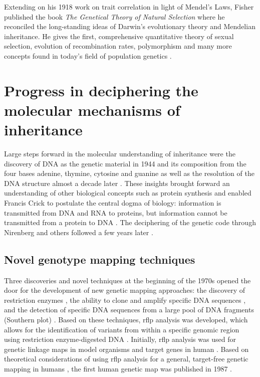 Extending on his 1918 work on trait correlation in light of Mendel's Laws, Fisher published the book \textit{The Genetical Theory of Natural Selection} where he reconciled the long-standing ideas of Darwin's evolutionary theory and Mendelian inheritance. He gives the first, comprehensive quantitative theory of sexual selection, evolution of recombination rates, polymorphism and many more concepts found in today's field of population genetics \citep{Fisher1930}. 

\section{Progress in deciphering the molecular mechanisms of inheritance}
Large steps forward in the molecular understanding of inheritance were the discovery of DNA as the genetic material in 1944 \citep{Avery1944} and its composition from the four bases adenine, thymine, cytosine and guanine \citep{Vischer1948,Chargaff1949,Chargaff1952} as well as the resolution of the DNA structure almost a decade later \citep{Watson1953}. These insights brought forward an understanding of other biological concepts such as protein synthesis and enabled Francis Crick to postulate the central dogma of biology:  information is transmitted from DNA and RNA to proteins, but information cannot be transmitted from a protein to DNA \citep{Crick1958}. The deciphering of the genetic code through Nirenberg and others followed a few years later \citep{Nirenberg1961,Crick1961,Matthaei1962}.  

\subsection{Novel genotype mapping techniques}
\label{subsection:mapping-techniques}
Three discoveries and novel techniques at the beginning of the 1970s opened the door for the development of new genetic mapping approaches: the discovery of restriction enzymes \citep{Smith1970,Morrow1972}, the ability to clone and amplify specific DNA sequences \citep{Jackson1972,Cohen1973}, and the detection of specific DNA sequences from a large pool of DNA fragments (Southern plot) \citep{Southern1975}. Based on these techniques, \gls{rflp} analysis was developed, which allows for the identification of variants from within a specific genomic region using restriction enzyme-digested DNA \citep{Grodzicker1974,Botstein1980}. Initially, \gls{rflp} analysis was used for genetic linkage maps in model organisms \citep{Goodman1977,Cameron1979} and target genes in human  \citep{Kan1978,Jeffreys1979,Tuan1979}. Based on theoretical considerations of using \gls{rflp} analysis for a general, target-free genetic mapping in humans \citep{Botstein1980}, the first human genetic map was published in 1987 \citep{Donis-Keller1987}. 

